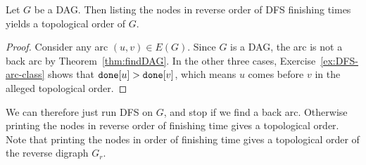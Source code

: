 \begin{Theorem}
Let $G$ be a DAG. Then listing the nodes in reverse order of DFS
finishing times yields a topological order of $G$.
\end{Theorem}

\begin{proof} 
Consider any arc $(u,v)\in E(G)$. Since $G$ is a DAG,
the arc is not a back arc by Theorem~\ref{thm:findDAG}. In the other three
cases, Exercise~\ref{ex:DFS-arc-class} shows that $\done[u] > \done[v]$,
which means $u$ comes before $v$ in the alleged topological order.
\end{proof}

We can therefore just run DFS on $G$, and stop if we find a back
arc. Otherwise printing the nodes in reverse order of finishing time
gives a topological order. Note that printing the nodes in order of
finishing time gives a topological order of the reverse digraph $G_r$.

%
%
%
%
%
%
%
%
%
%

